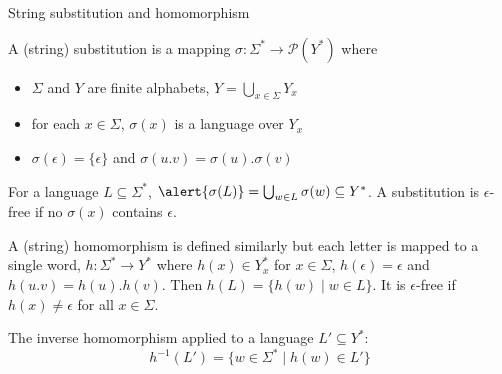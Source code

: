 \documentclass[handout]{beamer}
\begin{document}
\begin{frame}{String substitution and homomorphism}
   
    A (string) \alert{substitution} is a mapping $\sigma\colon \Sigma^*\rightarrow \mathcal P(Y^*)$ where
    \begin{itemize}
        \item $\Sigma$ and $Y$ are finite alphabets, $Y=\bigcup_{x\in \Sigma}Y_x$
        \item for each $x\in \Sigma$, $\sigma(x)$ is a language over $Y_x$
        \item $\sigma(\epsilon)=\{\epsilon\}$ and $\sigma(u.v)=\sigma(u).\sigma(v)$
    \end{itemize}
    For a language $L\subseteq \Sigma^*$, $\alert{\sigma(L)}=\bigcup_{w\in L}\sigma(w)\subseteq Y^*$. A substitution is \alert{$\epsilon$-free} if no $\sigma(x)$ contains $\epsilon$.

    A (string) \alert{homomorphism} is defined similarly but each letter is mapped to a single word, $h\colon\Sigma^*\rightarrow Y^*$ where $h(x)\in Y_x^*$ for $x\in\Sigma$, $h(\epsilon)=\epsilon$ and $h(u.v)=h(u).h(v)$. Then \alert{$h(L)=\{h(w)\mid w\in L\}$}. It is \alert{$\epsilon$-free} if $h(x)\neq\epsilon$ for all $x\in\Sigma$.

    The \alert{inverse homomorphism} applied to a language $L'\subseteq Y^*$: 
    $$
    h^{-1}(L')=\{w\in\Sigma^*\mid h(w)\in L'\}
    $$

\end{frame}
\end{document}
